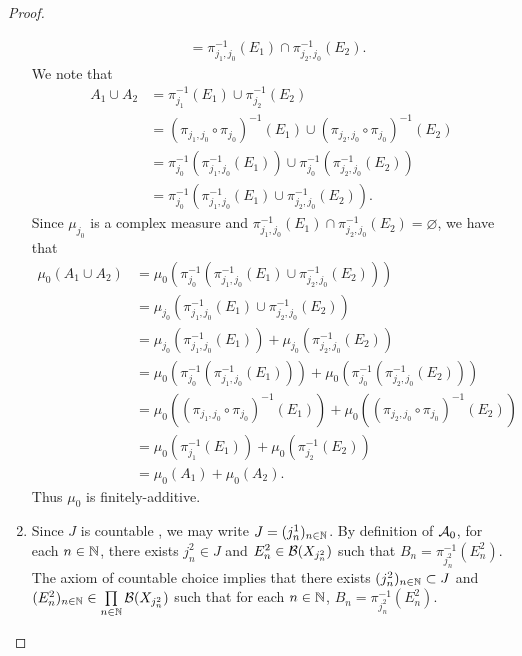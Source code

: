 \documentclass{book}
\begin{document}
\begin{proof}
\begin{enumerate}
\begin{align*}
			& = \pi_{j_1, j_0}^{-1}(E_1) \cap \pi_{j_2, j_0}^{-1}(E_2).
		\end{align*}
		We note that 
		\begin{align*}
			A_1 \cup A_2
			& = \pi_{j_1}^{-1}(E_1) \cup \pi_{j_2}^{-1}(E_2) \\
			& = (\pi_{j_1, j_0} \circ \pi_{j_0})^{-1}(E_1) \cup  (\pi_{j_2, j_0} \circ \pi_{j_0})^{-1}(E_2) \\
			& = \pi_{j_0}^{-1}(\pi_{j_1, j_0}^{-1}(E_1)) \cup \pi_{j_0}^{-1}(\pi_{j_2, j_0}^{-1}(E_2)) \\
			& = \pi_{j_0}^{-1}(\pi_{j_1, j_0}^{-1}(E_1) \cup \pi_{j_2, j_0}^{-1}(E_2)).
		\end{align*}
		Since $\mu_{j_0}$ is a complex measure and $\pi_{j_1, j_0}^{-1}(E_1) \cap \pi_{j_2, j_0}^{-1}(E_2) = \varnothing$, we have that 
		\begin{align*}
			\mu_0(A_1 \cup A_2) 
			& = \mu_0(\pi_{j_0}^{-1}(\pi_{j_1, j_0}^{-1}(E_1) \cup \pi_{j_2, j_0}^{-1}(E_2))) \\
			& = \mu_{j_0}(\pi_{j_1, j_0}^{-1}(E_1) \cup \pi_{j_2, j_0}^{-1}(E_2)) \\
			& = \mu_{j_0}(\pi_{j_1, j_0}^{-1}(E_1)) + \mu_{j_0}(\pi_{j_2, j_0}^{-1}(E_2)) \\
			& = \mu_0(\pi_{j_0}^{-1}(\pi_{j_1, j_0}^{-1}(E_1))) + \mu_0(\pi_{j_0}^{-1}(\pi_{j_2, j_0}^{-1}(E_2))) \\
			& = \mu_0((\pi_{j_1, j_0} \circ \pi_{j_0})^{-1}(E_1)) + \mu_0((\pi_{j_2, j_0} \circ \pi_{j_0})^{-1}(E_2)) \\
			& = \mu_0(\pi_{j_1}^{-1}(E_1)) + \mu_0(\pi_{j_2}^{-1}(E_2)) \\
			& = \mu_0(A_1) + \mu_0(A_2).
		\end{align*}
		Thus $\mu_0$ is finitely-additive. 
		\item Since $J$ is countable , we may write $J = (j^1_n)_{n \in \mathbb{N}}$. By definition of $\mathcal{A}_0$, for each $n \in \mathbb{N}$, there exists $j^2_n \in J$ and $E^2_n \in \mathcal{B}(X_{j^2_n})$ such that $B_n = \pi_{j^2_n}^{-1}(E^2_n)$. The axiom of countable choice implies that there exists $(j^2_n)_{n \in \mathbb{N}} \subset J$ and $(E_n^2)_{n \in \mathbb{N}} \in \prod\limits_{n \in \mathbb{N}} \mathcal{B}(X_{j^2_n})$ such that for each $n \in \mathbb{N}$, $B_n = \pi_{j^2_n}^{-1}(E^2_n)$. 
		

\end{enumerate}
\end{proof}
\end{document}
